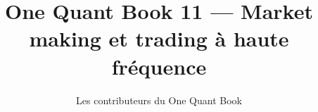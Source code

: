 \documentclass[11pt,a4paper,twoside,openany]{book}
\title{One Quant Book 11 --- Market making et trading à haute fréquence}
\author{Les contributeurs du One Quant Book}
\date{\bookdate}
\begin{document}
\frontmatter



\tableofcontents

\mainmatter


\appendix
\part{\omsolutionspart}


\backmatter
\printindex
\end{document}
